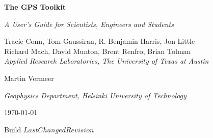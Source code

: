 
\begin{titlepage}

\begin{center}

\addvspace{30pt}


{ \Huge\bf The GPS Toolkit }

\addvspace{10pt}

{ \huge\it A User's Guide for Scientists, Engineers and Students }

\addvspace{60pt}

Tracie Conn, Tom Gaussiran, R. Benjamin Harris, Jon Little \\
Richard Mach, David Munton, Brent Renfro, Brian Tolman \\

\addvspace{3pt}
{ \it Applied Research Laboratories, The University of Texas at Austin}

\addvspace{10pt}

Martin Vermeer

\addvspace{3pt}
{ \it Geophysics Department, Helsinki University of Technology}

\addvspace{60pt}

\today



Build $LastChangedRevision$

\end {center}

\end{titlepage}

